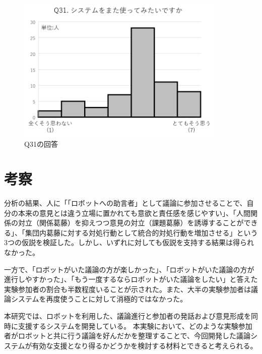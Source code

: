 \documentclass[11pt, a4paper]{jreport} %
\begin{document}
\begin{figure}[htbp]
\begin{center}
\includegraphics[width=100mm]{images/matatuka.png}
\caption{Q31の回答}
\label{fig:jikken3_31}
\end{center}
\end{figure}




\section{考察}
分析の結果、人に「「ロボットへの助言者」として議論に参加させることで、自分の本来の意見とは違う立場に置かれても意欲と責任感を感じやすい」、「人間関係の対立（関係葛藤）を抑えつつ意見の対立（課題葛藤）を誘導することができる」、「集団内葛藤に対する対処行動として統合的対処行動を増加させる」という3つの仮説を検証した。しかし、いずれに対しても仮説を支持する結果は得られなかった。


一方で、「ロボットがいた議論の方が楽しかった」、「ロボットがいた議論の方が進行しやすかった」、「もう一度するならロボットがいた議論をしたい」と答えた実験参加者の割合も半数程度いることが示された。また、大半の実験参加者は議論システムを再度使うことに対して消極的ではなかった。


本研究では、ロボットを利用した、議論進行と参加者の発話および意見形成を同時に支援するシステムを開発している。
本実験において、どのような実験参加者がロボットと共に行う議論を好んだかを整理することで、今回開発した議論システムが有効な支援となり得るかどうかを検討する材料とできると考えられる。
\end{document}

